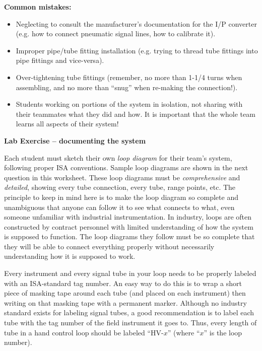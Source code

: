 \begin{itemize}
\vskip 10pt

{\bf Common mistakes:}

\begin{itemize}
\item{} Neglecting to consult the manufacturer's documentation for the I/P converter (e.g. how to connect pneumatic signal lines, how to calibrate it).
\item{} Improper pipe/tube fitting installation (e.g. trying to thread tube fittings into pipe fittings and vice-versa).
\item{} Over-tightening tube fittings (remember, no more than 1-1/4 turns when assembling, and no more than ``snug'' when re-making the connection!).
\item{} Students working on portions of the system in isolation, not sharing with their teammates what they did and how.  It is important that the whole team learns all aspects of their system!
\end{itemize}


\vfil \eject

\noindent
{\bf Lab Exercise -- documenting the system}

\vskip 5pt

Each student must sketch their own {\it loop diagram} for their team's system, following proper ISA conventions.  Sample loop diagrams are shown in the next question in this worksheet.  These loop diagrams must be {\it comprehensive} and {\it detailed}, showing every tube connection, every tube, range points, etc.  The principle to keep in mind here is to make the loop diagram so complete and unambiguous that anyone can follow it to see what connects to what, even someone unfamiliar with industrial instrumentation.  In industry, loops are often constructed by contract personnel with limited understanding of how the system is supposed to function.  The loop diagrams they follow must be so complete that they will be able to connect everything properly without necessarily understanding how it is supposed to work.

Every instrument and every signal tube in your loop needs to be properly labeled with an ISA-standard tag number.  An easy way to do this is to wrap a short piece of masking tape around each tube (and placed on each instrument) then writing on that masking tape with a permanent marker.  Although no industry standard exists for labeling signal tubes, a good recommendation is to label each tube with the tag number of the field instrument it goes to.  Thus, every length of tube in a hand control loop should be labeled ``HV-$x$'' (where ``$x$'' is the loop number).


\end{itemize}
